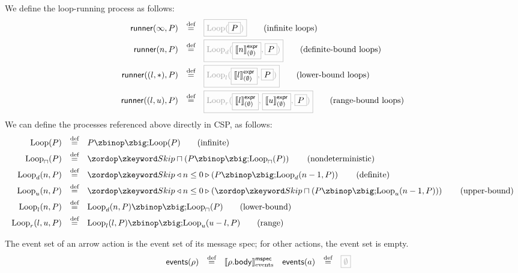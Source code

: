 \newcommand{\iloop}[1]{\text{Loop}(#1)}
\newcommand{\nloop}[1]{\text{Loop}_{\intchoice}(#1)}
\newcommand{\dloop}[2]{\text{Loop}_d(#1, #2)}
\newcommand{\lloop}[2]{\text{Loop}_l(#1, #2)}
\newcommand{\uloop}[2]{\text{Loop}_u(#1, #2)}
\newcommand{\rloop}[3]{\text{Loop}_r(#1, #2, #3)}

\begin{definition}
We define the loop-running process as follows:
%
\begin{align*}
  \funcname{runner}(\infty, P)
  \quad\defeq\quad
  & \tlang{\iloop{\olang{P}}}
    \tag{infinite loops}
  \\
  \funcname{runner}(n, P)
  \quad\defeq\quad
  & \tlang{\dloop{\olang{\exprsema{n}{\emptyset}}}{\olang{P}}}
    \tag{definite-bound loops}
  \\
  \funcname{runner}((l, \ast), P)
  \quad\defeq\quad
  & \tlang{\lloop{\olang{\exprsema{l}{\emptyset}}}{\olang{P}}}
    \tag{lower-bound loops}
  \\
  \funcname{runner}((l, u), P)
  \quad\defeq\quad
  & \tlang{\rloop{\olang{\exprsema{l}{\emptyset}}}{\olang{\exprsema{u}{\emptyset}}}{\olang{P}}}
    \tag{range-bound loops}
  \\  
\end{align*}
%
We can define the processes referenced above directly in CSP, as follows:
%
\begin{align*}
  \iloop{P}
  \quad\defeq\quad
  & P \circseq \iloop{P}
    \tag{infinite}
  \\
  \nloop{P}
  \quad\defeq\quad
  & \Skip \intchoice \left(P \circseq \nloop{P}\right)
    \tag{nondeterministic}
  \\  
  \dloop{n}{P}
  \quad\defeq\quad
  & \Skip \triangleleft n \leq 0 \triangleright \left(P \circseq \dloop{n-1}{P}\right)
    \tag{definite}
  \\
  \uloop{n}{P}
  \quad\defeq\quad
  & \Skip \triangleleft n \leq 0 \triangleright \left(\Skip \intchoice \left(P \circseq \uloop{n-1}{P}\right)\right)
    \tag{upper-bound}
  \\
  \lloop{n}{P}
  \quad\defeq\quad
  & \dloop{n}{P} \circseq \nloop{P}
    \tag{lower-bound}
  \\
  \rloop{l}{u}{P}
  \quad\defeq\quad
  & \lloop{l}{P} \circseq \uloop{u - l}{P}
    \tag{range}
  \\
\end{align*}
\end{definition}

\begin{definition}
  The event set of an arrow action is the event set of its message spec; for
  other actions, the event set is empty.
%
  \begin{align*}
    \eventsOf{\anarrow}
    \quad\defeq\quad
    &
      \emspecsema{\field{\anarrow}{body}}
    &
      \eventsOf{\anaction}
      \quad\defeq\quad
    &
      \tlang{\emptyset}
  \end{align*}
\end{definition}

